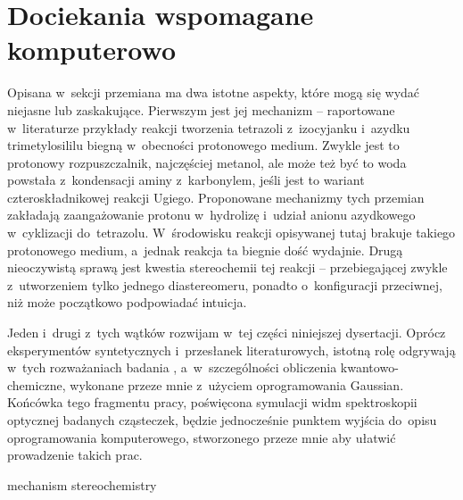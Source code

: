 \chapter{Dociekania wspomagane komputerowo}\label{chapter:numeric}

Opisana w~sekcji \textit{} przemiana ma dwa istotne aspekty,
  które mogą się wydać niejasne lub zaskakujące.
Pierwszym jest jej mechanizm \--- raportowane w~literaturze przykłady reakcji tworzenia tetrazoli
  z~izocyjanku i~azydku trimetylosililu biegną w~obecności protonowego medium.
Zwykle jest to protonowy rozpuszczalnik, najczęściej metanol, ale może też być to woda powstała
  z~kondensacji aminy z~karbonylem, jeśli jest to wariant czteroskładnikowej reakcji Ugiego.
Proponowane mechanizmy tych przemian zakładają zaangażowanie protonu w~hydrolizę 
  i~udział anionu azydkowego w~cyklizacji do~tetrazolu.
W~środowisku reakcji opisywanej tutaj brakuje takiego protonowego medium, a~jednak reakcja
  ta biegnie dość wydajnie.
Drugą nieoczywistą sprawą jest kwestia stereochemii tej reakcji \--- przebiegającej zwykle
  z~utworzeniem tylko jednego diastereomeru, ponadto o~konfiguracji przeciwnej, niż może
  początkowo podpowiadać intuicja.

Jeden i~drugi z~tych wątków rozwijam w~tej części niniejszej dysertacji.
Oprócz eksperymentów syntetycznych i~przesłanek literaturowych, istotną rolę odgrywają w~tych
  rozważaniach badania , a~w~szczególności obliczenia kwantowo-chemiczne,
  wykonane przeze mnie z~użyciem oprogramowania Gaussian.
Końcówka tego fragmentu pracy, poświęcona symulacji widm spektroskopii optycznej badanych
  cząsteczek, będzie jednocześnie punktem wyjścia do~opisu oprogramowania komputerowego,
  stworzonego przeze mnie aby ułatwić prowadzenie takich prac.

{mechanism}
{stereochemistry}

